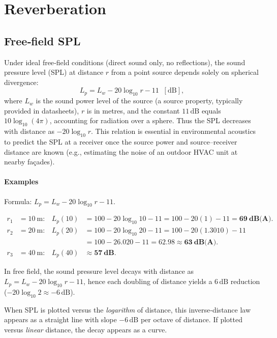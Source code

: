 \section{Reverberation}
\subsection{Free‐field SPL}

Under ideal free‐field conditions (direct sound only, no reflections), the sound pressure level (SPL) at distance \(r\) from a point source depends solely on spherical divergence:
\[
L_p = L_w - 20\log_{10} r - 11 \;\;[\mathrm{dB}],
\]
where \(L_w\) is the sound power level of the source (a source property, typically provided in datasheets), \(r\) is in metres, and the constant \(11\,\mathrm{dB}\) equals \(10\log_{10}(4\pi)\), accounting for radiation over a sphere. Thus the SPL decreases with distance as \(-20\log_{10} r\). This relation is essential in environmental acoustics to predict the SPL at a receiver once the source power and source–receiver distance are known (e.g., estimating the noise of an outdoor HVAC unit at nearby façades).

\paragraph{Examples}
Formula: \(\displaystyle L_p = L_w - 20\log_{10} r - 11\).

\[
\begin{aligned}
r_1 &= 10~\text{m}: &
L_p(10) &= 100 - 20\log_{10}10 - 11
= 100 - 20(1) - 11 = \mathbf{69~\text{dB(A)}}.\\[4pt]
r_2 &= 20~\text{m}: &
L_p(20) &= 100 - 20\log_{10}20 - 11
= 100 - 20(1.3010) - 11 \\
&&&= 100 - 26.020 - 11 = \mathbf{62.98 \approx 63~\text{dB(A)}}.\\[4pt]
r_3 &= 40~\text{m}: &
L_p(40) &\mathbf{ \approx 57~\text{dB}}.
\end{aligned}
\]

In free field, the sound pressure level decays with distance as
\(L_p=L_w-20\log_{10}r-11\), hence each doubling of distance yields a
\(6\,\mathrm{dB}\) reduction (\(-20\log_{10}2 \approx -6\,\mathrm{dB}\)).

When SPL is plotted versus the \emph{logarithm} of distance, this
inverse‐distance law appears as a straight line with slope \(-6\,\mathrm{dB}\) per
octave of distance. If plotted versus \emph{linear} distance, the decay
appears as a curve.

